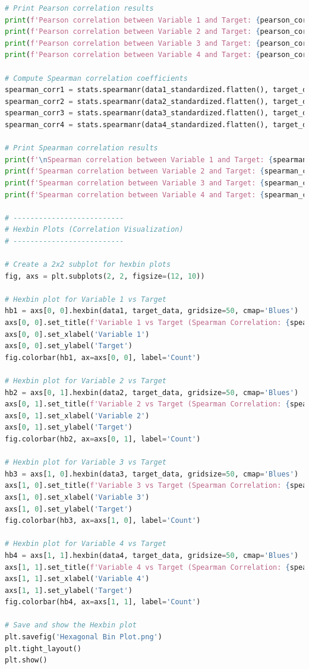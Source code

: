 \documentclass{swmcmthesis}
\begin{document}
\begin{lstlisting}[language=python,caption={The python programme for Problem 2}]
# Print Pearson correlation results
print(f'Pearson correlation between Variable 1 and Target: {pearson_corr1}')
print(f'Pearson correlation between Variable 2 and Target: {pearson_corr2}')
print(f'Pearson correlation between Variable 3 and Target: {pearson_corr3}')
print(f'Pearson correlation between Variable 4 and Target: {pearson_corr4}')

# Compute Spearman correlation coefficients
spearman_corr1 = stats.spearmanr(data1_standardized.flatten(), target_data_standardized.flatten())[0]
spearman_corr2 = stats.spearmanr(data2_standardized.flatten(), target_data_standardized.flatten())[0]
spearman_corr3 = stats.spearmanr(data3_standardized.flatten(), target_data_standardized.flatten())[0]
spearman_corr4 = stats.spearmanr(data4_standardized.flatten(), target_data_standardized.flatten())[0]

# Print Spearman correlation results
print(f'\nSpearman correlation between Variable 1 and Target: {spearman_corr1}')
print(f'Spearman correlation between Variable 2 and Target: {spearman_corr2}')
print(f'Spearman correlation between Variable 3 and Target: {spearman_corr3}')
print(f'Spearman correlation between Variable 4 and Target: {spearman_corr4}')

# --------------------------
# Hexbin Plots (Correlation Visualization)
# --------------------------

# Create a 2x2 subplot for hexbin plots
fig, axs = plt.subplots(2, 2, figsize=(12, 10))

# Hexbin plot for Variable 1 vs Target
hb1 = axs[0, 0].hexbin(data1, target_data, gridsize=50, cmap='Blues')
axs[0, 0].set_title(f'Variable 1 vs Target (Spearman Correlation: {spearman_corr1:.2f})')
axs[0, 0].set_xlabel('Variable 1')
axs[0, 0].set_ylabel('Target')
fig.colorbar(hb1, ax=axs[0, 0], label='Count')

# Hexbin plot for Variable 2 vs Target
hb2 = axs[0, 1].hexbin(data2, target_data, gridsize=50, cmap='Blues')
axs[0, 1].set_title(f'Variable 2 vs Target (Spearman Correlation: {spearman_corr2:.2f})')
axs[0, 1].set_xlabel('Variable 2')
axs[0, 1].set_ylabel('Target')
fig.colorbar(hb2, ax=axs[0, 1], label='Count')

# Hexbin plot for Variable 3 vs Target
hb3 = axs[1, 0].hexbin(data3, target_data, gridsize=50, cmap='Blues')
axs[1, 0].set_title(f'Variable 3 vs Target (Spearman Correlation: {spearman_corr3:.2f})')
axs[1, 0].set_xlabel('Variable 3')
axs[1, 0].set_ylabel('Target')
fig.colorbar(hb3, ax=axs[1, 0], label='Count')

# Hexbin plot for Variable 4 vs Target
hb4 = axs[1, 1].hexbin(data4, target_data, gridsize=50, cmap='Blues')
axs[1, 1].set_title(f'Variable 4 vs Target (Spearman Correlation: {spearman_corr4:.2f})')
axs[1, 1].set_xlabel('Variable 4')
axs[1, 1].set_ylabel('Target')
fig.colorbar(hb4, ax=axs[1, 1], label='Count')

# Save and show the Hexbin plot
plt.savefig('Hexagonal Bin Plot.png')
plt.tight_layout()
plt.show()

 \end{lstlisting}
\end{document}
